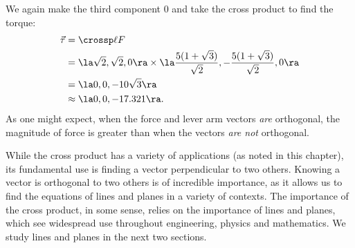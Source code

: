 {\begin{enumerate}
	We again make the third component 0 and take the cross product to find the torque:
	\begin{align*}
	\vec\tau &= \crossp \ell F\\
					&= \la \sqrt2,\sqrt2,0\ra \times  \la \frac{5(1+\sqrt3)}{\sqrt2},-\frac{5(1+\sqrt3)}{\sqrt2},0\ra\\
					&= \la 0,0,-10\sqrt3\ra\\
					&\approx \la 0,0,-17.321\ra.
	\end{align*}
	As one might expect, when the force and lever arm vectors \textit{are} orthogonal, the magnitude of force is greater than when the vectors \textit{are not} orthogonal.
\end{enumerate}}

While the cross product has a variety of applications (as noted in this chapter), its fundamental use is finding a vector perpendicular to two others. Knowing a vector is orthogonal to two others is of incredible importance, as it allows us to find the equations of lines and planes in a variety of contexts. The importance of the cross product, in some sense, relies on the importance of lines and planes, which see widespread use throughout engineering, physics and mathematics. We study lines and planes in the next two sections. 


